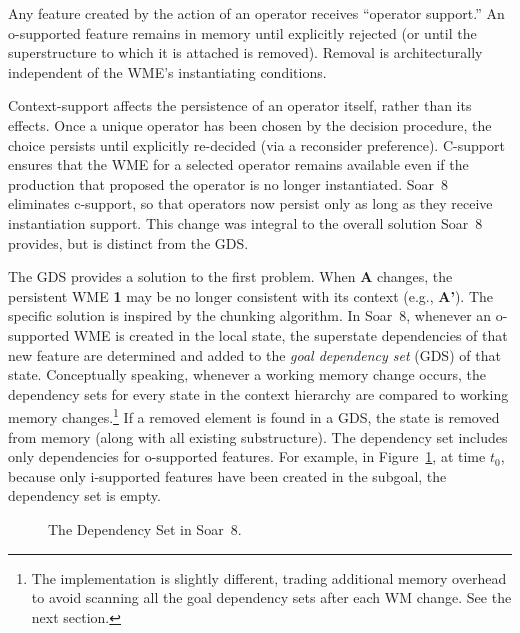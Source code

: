 Any feature created by the action of an operator
receives ``operator support.''  An o-supported feature remains in
memory until explicitly rejected (or until the superstructure to which
it is attached is removed).  Removal is architecturally
independent of the WME's instantiating conditions.

Context-support affects the persistence of an operator itself, rather
than its effects.  Once a unique operator has been chosen by the
decision procedure, the choice persists until explicitly re-decided
(via a reconsider preference).  C-support ensures that the WME for a
selected operator remains available even if the production that
proposed the operator is no longer instantiated.  Soar~8 eliminates
c-support, so that operators now persist only as long as they receive
instantiation support.  This change was integral to the overall
solution Soar~8 provides, but is distinct from the GDS.

The GDS provides a solution to the first problem.  When {\bf A}
changes, the persistent WME {\bf 1} may be no longer consistent with
its context (e.g., {\bf A'}).  The specific solution is inspired by
the chunking algorithm.  In Soar~8, whenever an o-supported WME is
created in the local state, the superstate dependencies of that new
feature are determined and added to the {\em goal dependency set}
(GDS) of that state. Conceptually speaking, whenever a working memory
change occurs, the dependency sets for every state in the context
hierarchy are compared to working memory changes.\footnote{The
implementation is slightly different, trading additional memory
overhead to avoid scanning all the goal dependency sets after each WM
change.  See the next section.  }  If a removed element is found in a
GDS, the state is removed from memory (along with all existing
substructure). The dependency set includes only dependencies for
o-supported features.  For example, in Figure~\ref{'gds'}, at time
$t_0$, because only i-supported features have been created in the
subgoal, the dependency set is empty.

\begin{figure}
\caption{The Dependency Set in Soar~8.}
\label{'gds'}
\end{figure}


